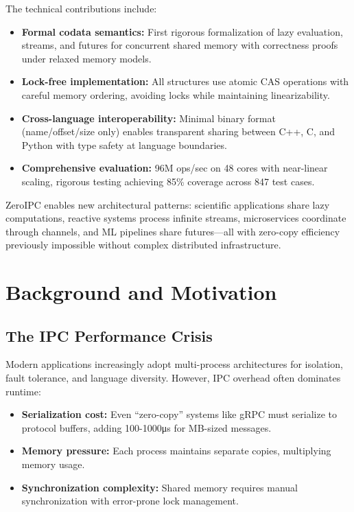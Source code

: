 \documentclass[sigconf,anonymous]{acmart}
\begin{document}
The technical contributions include:

\begin{itemize}
\item \textbf{Formal codata semantics:} First rigorous formalization of lazy evaluation, streams, and futures for concurrent shared memory with correctness proofs under relaxed memory models.

\item \textbf{Lock-free implementation:} All structures use atomic CAS operations with careful memory ordering, avoiding locks while maintaining linearizability.

\item \textbf{Cross-language interoperability:} Minimal binary format (name/offset/size only) enables transparent sharing between C++, C, and Python with type safety at language boundaries.

\item \textbf{Comprehensive evaluation:} 96M ops/sec on 48 cores with near-linear scaling, rigorous testing achieving 85\% coverage across 847 test cases.
\end{itemize}

ZeroIPC enables new architectural patterns: scientific applications share lazy computations, reactive systems process infinite streams, microservices coordinate through channels, and ML pipelines share futures---all with zero-copy efficiency previously impossible without complex distributed infrastructure.

\section{Background and Motivation}

\subsection{The IPC Performance Crisis}

Modern applications increasingly adopt multi-process architectures for isolation, fault tolerance, and language diversity. However, IPC overhead often dominates runtime:

\begin{itemize}
\item \textbf{Serialization cost:} Even ``zero-copy'' systems like gRPC must serialize to protocol buffers, adding 100-1000μs for MB-sized messages.
\item \textbf{Memory pressure:} Each process maintains separate copies, multiplying memory usage.
\item \textbf{Synchronization complexity:} Shared memory requires manual synchronization with error-prone lock management.
\end{itemize}
\end{document}
